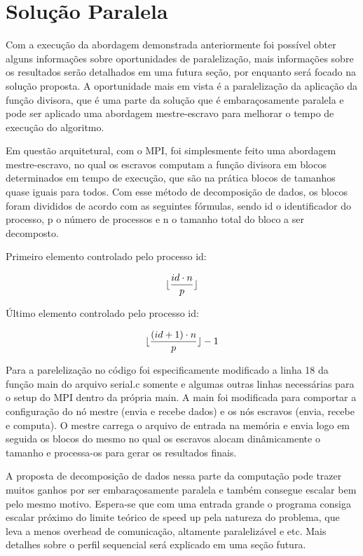 \documentclass{article}
\DeclarePairedDelimiter\floor{\lfloor}{\rfloor}
\begin{document}
\section{Solução Paralela}

Com a execução da abordagem demonstrada anteriormente foi possível obter alguns informações sobre oportunidades de paralelização, mais informações sobre os resultados serão detalhados em uma futura seção, por enquanto será focado na solução proposta. A oportunidade mais em vista é a paralelização da aplicação da função divisora, que é uma parte da solução que é embaraçosamente paralela e pode ser aplicado uma abordagem mestre-escravo para melhorar o tempo de execução do algoritmo.

Em questão arquitetural, com o MPI, foi simplesmente feito uma abordagem mestre-escravo, no qual os escravos computam a função divisora em blocos determinados em tempo de execução, que são na prática blocos de tamanhos quase iguais para todos. Com esse método de decomposição de dados, os blocos foram divididos de acordo com as seguintes fórmulas, sendo id o identificador do processo, p o número de processos e n o tamanho total do bloco a ser decomposto.

Primeiro elemento controlado pelo processo id:

\begin{equation}
\floor{\frac{id\cdot n}{p}}
\end{equation}

Último elemento controlado pelo processo id:

\begin{equation}
\floor{\frac{(id+1)\cdot n}{p}}-1
\end{equation}

Para a parelelização no código foi especificamente modificado a linha 18 da função main do arquivo serial.c somente e algumas outras linhas necessárias para o setup do MPI dentro da própria main. A main foi modificada para comportar a configuração do nó mestre (envia e recebe dados) e os nós escravos (envia, recebe e computa). O mestre carrega o arquivo de entrada na memória e envia logo em seguida os blocos do mesmo no qual os escravos alocam dinâmicamente o tamanho e processa-os para gerar os resultados finais.

A proposta de decomposição de dados nessa parte da computação pode trazer muitos ganhos por ser embaraçosamente paralela e também consegue escalar bem pelo mesmo motivo. Espera-se que com uma entrada grande o programa consiga escalar próximo do limite teórico de speed up pela natureza do problema, que leva a menos overhead de comunicação, altamente paralelizável e etc. Mais detalhes sobre o perfil sequencial será explicado em uma seção futura.
\end{document}
